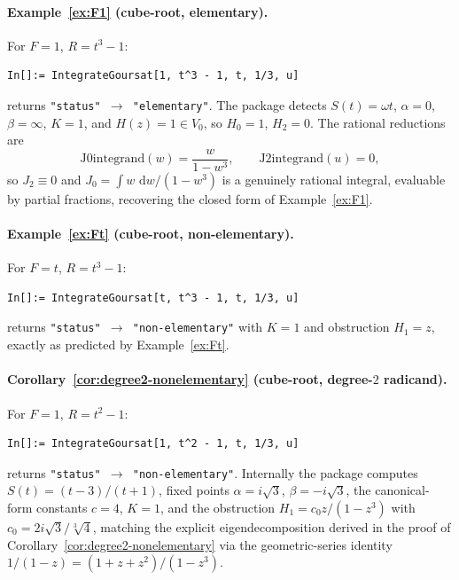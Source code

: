 \documentclass[11pt,a4paper]{article}
\theoremstyle{plain}
\theoremstyle{definition}
\theoremstyle{remark}
\renewcommand{\d}{\,\mathrm{d}}
\begin{document}
\paragraph{Example~\ref{ex:F1} (cube-root, elementary).} For $F=1$, $R=t^3-1$:
\begin{lstlisting}[basicstyle=\footnotesize\ttfamily,frame=none]
In[]:= IntegrateGoursat[1, t^3 - 1, t, 1/3, u]
\end{lstlisting}
returns \texttt{"status"\,$\to$\,"elementary"}. The package detects $S(t) = \omega t$, $\alpha=0$, $\beta=\infty$, $K=1$, and $H(z) = 1 \in V_0$, so $H_0 = 1$, $H_2 = 0$. The rational reductions are
\[
  \text{J0integrand}(w) = \frac{w}{1-w^3},\qquad \text{J2integrand}(u) = 0,
\]
so $J_2 \equiv 0$ and $J_0 = \int w\,\d w/(1-w^3)$ is a genuinely rational integral, evaluable by partial fractions, recovering the closed form of Example~\ref{ex:F1}.

\paragraph{Example~\ref{ex:Ft} (cube-root, non-elementary).} For $F=t$, $R=t^3-1$:
\begin{lstlisting}[basicstyle=\footnotesize\ttfamily,frame=none]
In[]:= IntegrateGoursat[t, t^3 - 1, t, 1/3, u]
\end{lstlisting}
returns \texttt{"status"\,$\to$\,"non-elementary"} with $K=1$ and obstruction $H_1 = z$, exactly as predicted by Example~\ref{ex:Ft}.

\paragraph{Corollary~\ref{cor:degree2-nonelementary} (cube-root, degree-$2$ radicand).} For $F=1$, $R=t^2-1$:
\begin{lstlisting}[basicstyle=\footnotesize\ttfamily,frame=none]
In[]:= IntegrateGoursat[1, t^2 - 1, t, 1/3, u]
\end{lstlisting}
returns \texttt{"status"\,$\to$\,"non-elementary"}. Internally the package computes $S(t)=(t-3)/(t+1)$, fixed points $\alpha=i\sqrt{3}$, $\beta=-i\sqrt{3}$, the canonical-form constants $c=4$, $K=1$, and the obstruction $H_1 = c_0 z/(1-z^3)$ with $c_0 = 2i\sqrt{3}/\sqrt[3]{4}$, matching the explicit eigendecomposition derived in the proof of Corollary~\ref{cor:degree2-nonelementary} via the geometric-series identity $1/(1-z) = (1+z+z^2)/(1-z^3)$.
\end{document}
